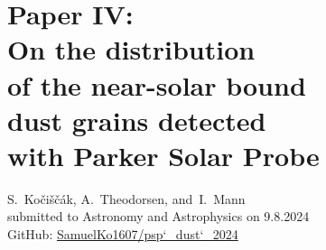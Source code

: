 \documentclass[11pt,twoside,openright]{book}
\begin{document}
\chapter[Paper IV: On the distribution of the near-solar bound dust grains detected with Parker Solar Probe]{Paper IV:\\On the distribution\\of the near-solar bound\\dust grains detected\\with Parker Solar Probe}
S.~Ko{\v{c}}i{\v{s}}{\v{c}}{\'a}k, A.~Theodorsen, and~I.~Mann\\
submitted to Astronomy and Astrophysics on 9.8.2024\\
GitHub: \href{https://zenodo.org/records/13284890}{SamuelKo1607/psp\char`_dust\char`_2024}\\
\newpage\null\newpage





\end{document}
